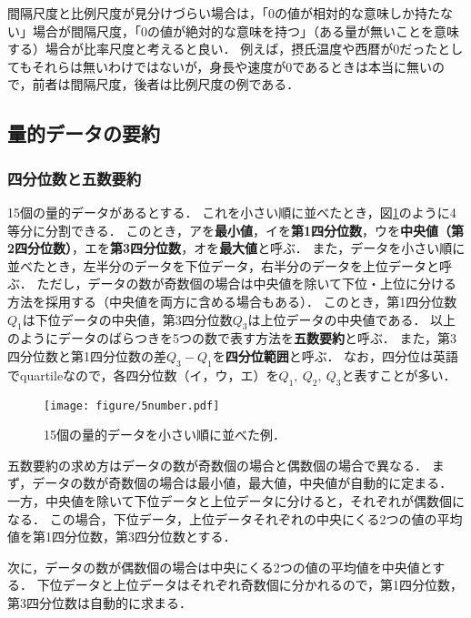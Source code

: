 %
間隔尺度と比例尺度が見分けづらい場合は，「0の値が相対的な意味しか持たない」場合が間隔尺度，「0の値が絶対的な意味を持つ」（ある量が無いことを意味する）場合が比率尺度と考えると良い．
%
例えば，摂氏温度や西暦が0だったとしてもそれらは無いわけではないが，身長や速度が0であるときは本当に無いので，前者は間隔尺度，後者は比例尺度の例である．
%

%



\subsection{量的データの要約}

\subsubsection*{四分位数と五数要約}
%
15個の量的データがあるとする．
%
これを小さい順に並べたとき，図\ref{fig:5number}のように4等分に分割できる．
%
このとき，アを\textbf{最小値}，イを\textbf{第1四分位数}，ウを\textbf{中央値（第2四分位数）}，エを\textbf{第3四分位数}，オを\textbf{最大値}と呼ぶ．
%
また，データを小さい順に並べたとき，左半分のデータを下位データ，右半分のデータを上位データと呼ぶ．
%
ただし，データの数が奇数個の場合は中央値を除いて下位・上位に分ける方法を採用する（中央値を両方に含める場合もある）．
%
このとき，第1四分位数$ Q_{1} $は下位データの中央値，第3四分位数$ Q_{3} $は上位データの中央値である．
%
以上のようにデータのばらつきを5つの数で表す方法を\textbf{五数要約}と呼ぶ．
%
また，第3四分位数と第1四分位数の差$ Q_{3}-Q_{1} $を\textbf{四分位範囲}と呼ぶ．
%
なお，四分位は英語でquartileなので，各四分位数（イ，ウ，エ）を$ Q_{1},\ Q_{2},\ Q_{3} $と表すことが多い．
%

%
\begin{figure}[H]
	\centering
	\texttt{[image: figure/5number.pdf]}
	\caption{15個の量的データを小さい順に並べた例．}
	\label{fig:5number}
\end{figure}
%

%
五数要約の求め方はデータの数が奇数個の場合と偶数個の場合で異なる．
%
まず，データの数が奇数個の場合は最小値，最大値，中央値が自動的に定まる．
%
一方，中央値を除いて下位データと上位データに分けると，それぞれが偶数個になる．
%
この場合，下位データ，上位データそれぞれの中央にくる2つの値の平均値を第1四分位数，第3四分位数とする．
%

%
次に，データの数が偶数個の場合は中央にくる2つの値の平均値を中央値とする．
%
下位データと上位データはそれぞれ奇数個に分かれるので，第1四分位数，第3四分位数は自動的に求まる．
%

